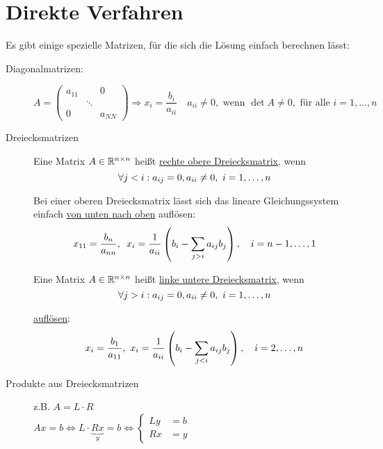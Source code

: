 \documentclass[../Skript.tex]{subfiles}
\begin{document}
\section{Direkte Verfahren}
Es gibt einige spezielle Matrizen, für die sich die Lösung einfach 
berechnen lässt:
\begin{description}
    \item[Diagonalmatrizen:]\[
    A=\begin{pmatrix}
        a_{11} &\ & 0 \\
        \ & \ddots & \ \\
        0 & \ & a_{NN}
    \end{pmatrix} \Rightarrow x_i=\frac{b_i}{a_{ii}}\quad a_{ii}\neq 0, 
    \text{ wenn }\det A\neq 0, \text{ für alle } i=1,\dots,n
    \]
            \item[Dreiecksmatrizen] \begin{definition}
            Eine Matrix $A\in \mathbb{R}^{n\times n}$ heißt \underline{rechte 
            obere Dreiecksmatrix}, wenn \[
                \forall j < i : a_{ij} = 0, a_{ii} \neq 0, \ \igb i 1 n\]
        \end{definition}
        Bei einer oberen Dreiecksmatrix lässt sich das lineare 
        Gleichungssystem einfach 
        \underline{von unten nach oben} auflösen:\begin{align*}
            x_{11} =  \frac{b_n}{a_{nn}}, \midspace x_i = \frac{1}{a_{ii}}
            \left(b_i - \sum_{j>i}a_{ij}b_j\right), \largespace \igb{i}
            {n-1}1
        \end{align*}
        \begin{definition}
            Eine Matrix $A\in \mathbb{R}^{n\times n}$ heißt \underline{linke 
            untere Dreiecksmatrix}, wenn \[
                \forall j > i : a_{ij} = 0, a_{ii} \neq 0, \ \igb i 1 n\]
        \end{definition}
        \underline{auflösen}:\[
            x_i = \frac{b_1}{a_{11}}, \ x_i = \frac{1}{a_{ii}}\left(b_i - 
            \sum_{j < i}a_{ij}b_j\right),\largespace \igb i 2 n\]
        \item[Produkte aus Dreiecksmatrizen] z.B. \(A=L\cdot R\)\\ \(Ax=b 
        \Leftrightarrow L\cdot \underset{y}{\underbrace{Rx}} = 
        b\Leftrightarrow \begin{cases}
            Ly &= b \\
            Rx &= y
        \end{cases}\) 
\end{description}
\end{document}
